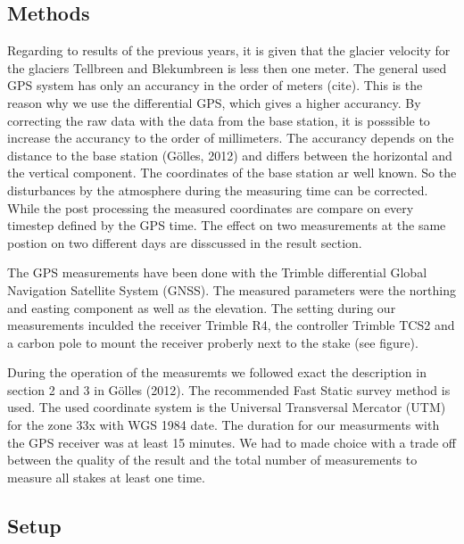 
\subsection{Methods}

Regarding to results of the previous years, it is given that the glacier velocity for the glaciers Tellbreen and Blekumbreen is less then one meter.
The general used GPS system has only an accurancy in the order of meters (cite).
This is the reason why we use the differential GPS, which gives a higher accurancy.
By correcting the raw data with the data from the base station, it is posssible to increase the accurancy to the order of millimeters.
The accurancy depends on the distance to the base station (Gölles, 2012) and differs between the horizontal and the vertical component.
The coordinates of the base station ar well known. 
So the disturbances by the atmosphere during the measuring time can be corrected. 
While the post processing the measured coordinates are compare on every timestep defined by the GPS time.
The effect on two measurements at the same postion on two different days are disscussed in the result section.\medskip

The GPS measurements have been done with the Trimble differential Global Navigation Satellite System (GNSS). 
The measured parameters were the northing and easting component as well as the elevation.
The setting during our measurements inculded the receiver Trimble R4, the controller Trimble TCS2 and a carbon pole to mount the receiver proberly next to the stake (see figure).\medskip

During the operation of the measuremts we followed exact the description in section 2 and 3 in Gölles (2012). 
The recommended Fast Static survey method is used.
The used coordinate system is the Universal Transversal Mercator (UTM) for the zone 33x with WGS 1984 date. 
The duration for our measurments with the GPS receiver was at least 15 minutes. 
We had to made choice with a trade off between the quality of the result and the total number of measurements to measure all stakes at least one time. 


\subsection{Setup}

